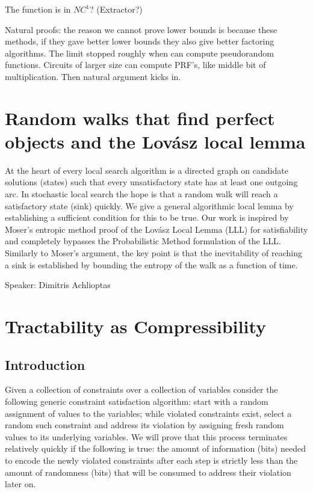 The function is in $NC^1$? (Extractor?)


Natural proofs: the reason we cannot prove lower bounds is because these methods, if they gave better lower bounds they also give better factoring algorithms. The limit stopped roughly when can compute pseudorandom functions. Circuits of larger size can compute PRF's, like middle bit of multiplication. Then natural argument kicks in. 



\section{Random walks that find perfect objects and the Lov\'asz local lemma}

At the heart of every local search algorithm is a directed graph on candidate solutions (states) such that every unsatisfactory state has at least one outgoing arc. In stochastic local search the hope is that a random walk will reach a satisfactory state (sink) quickly. We give a general algorithmic local lemma by establishing a sufficient condition for this to be true. Our work is inspired by Moser's entropic method proof of the Lov\'asz Local Lemma (LLL) for satisfiability and completely bypasses the Probabilistic Method formulation of the LLL. Similarly to Moser's argument, the key point is that the inevitability of reaching a sink is established by bounding the entropy of the walk as a function of time.

Speaker: Dimitris Achlioptas

\section{Tractability as Compressibility}

\subsection{Introduction}
Given a collection of constraints over a collection of variables consider the following generic constraint satisfaction algorithm: start with a random assignment of values to the variables; while violated constraints exist, select a random such constraint and address its violation by assigning fresh random values to its underlying variables. We will prove that this process terminates relatively quickly if the following is true: the amount of information (bits) needed to encode the newly violated constraints after each step is strictly less than the amount of randomness (bits) that will be consumed to address their violation later on.

